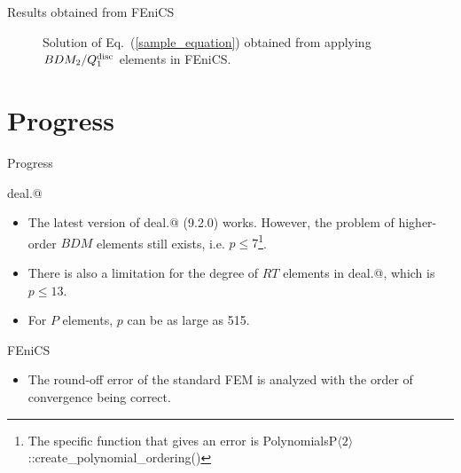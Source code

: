 \documentclass{beamer}
\makeatletter
\newcommand*{\rom}[1]{\expandafter\@slowromancap\romannumeral #1@}
\makeatother
\begin{document}
\begin{frame}{Results obtained from FEniCS}
\vspace{-3em}
\begin{figure}
\caption{Solution of Eq.~(\ref{sample_equation}) obtained from applying $BDM_2/Q_1^{\rm disc}$ elements in FEniCS.}
\label{results_fenics}
\end{figure}
\end{frame}


\section{Progress}
\begin{frame}{Progress}
\vspace{-3.5em}
\begin{block}{deal.\rom{2}}
\begin{itemize}
 \item The latest version of deal.\rom{2} (9.2.0) works. However, the problem of higher-order $BDM$ elements still exists, i.e. $p\leq 7$\footnote{The specific function that gives an error is PolynomialsP$\langle2\rangle$::create\_polynomial\_ordering()}.
 \item There is also a limitation for the degree of $RT$ elements in deal.\rom{2}, which is $p\leq 13$.
 \item For $P$ elements, $p$ can be as large as 515.
\end{itemize}
\end{block}
\begin{block}{FEniCS}
\begin{itemize}
 \item The round-off error of the standard FEM is analyzed with the order of convergence being correct.
\end{itemize}
\end{block}
\end{frame}
\end{document}
